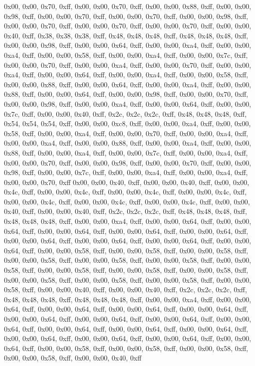 0x00, 0x00, 0x70, 0xff, 0x00, 0x00, 0x70, 0xff, 0x00, 0x00, 0x88, 0xff, 0x00, 0x00, 0x98, 0xff, 0x00, 0x00, 0x70, 0xff, 0x00, 0x00, 0x70, 0xff, 0x00, 0x00, 0x98, 0xff, 0x00, 0x00, 0x70, 0xff, 0x00, 0x00, 0x70, 0xff, 0x00, 0x00, 0x70, 0xff, 0x00, 0x00, 0x40, 0xff, 0x38, 0x38, 0x38, 0xff, 0x48, 0x48, 0x48, 0xff, 0x48, 0x48, 0x48, 0xff, 0x00, 0x00, 0x98, 0xff, 0x00, 0x00, 0x64, 0xff, 0x00, 0x00, 0xa4, 0xff, 0x00, 0x00, 0xa4, 0xff, 0x00, 0x00, 0x58, 0xff, 0x00, 0x00, 0xa4, 0xff, 0x00, 0x00, 0x7c, 0xff, 0x00, 0x00, 0x70, 0xff, 0x00, 0x00, 0xa4, 0xff, 0x00, 0x00, 0x70, 0xff, 0x00, 0x00, 0xa4, 0xff, 0x00, 0x00, 0x64, 0xff, 0x00, 0x00, 0xa4, 0xff, 0x00, 0x00, 0x58, 0xff, 0x00, 0x00, 0x88, 0xff, 0x00, 0x00, 0x64, 0xff, 0x00, 0x00, 0xa4, 0xff, 0x00, 0x00, 0x88, 0xff, 0x00, 0x00, 0x64, 0xff, 0x00, 0x00, 0x98, 0xff, 0x00, 0x00, 0x70, 0xff, 0x00, 0x00, 0x98, 0xff, 0x00, 0x00, 0xa4, 0xff, 0x00, 0x00, 0x64, 0xff, 0x00, 0x00, 0x7c, 0xff, 0x00, 0x00, 0x40, 0xff, 0x2c, 0x2c, 0x2c, 0xff, 0x48, 0x48, 0x48, 0xff, 0x54, 0x54, 0x54, 0xff, 0x00, 0x00, 0xc8, 0xff, 0x00, 0x00, 0xa4, 0xff, 0x00, 0x00, 0x58, 0xff, 0x00, 0x00, 0xa4, 0xff, 0x00, 0x00, 0x70, 0xff, 0x00, 0x00, 0xa4, 0xff, 0x00, 0x00, 0xa4, 0xff, 0x00, 0x00, 0x88, 0xff, 0x00, 0x00, 0xa4, 0xff, 0x00, 0x00, 0x88, 0xff, 0x00, 0x00, 0xa4, 0xff, 0x00, 0x00, 0x7c, 0xff, 0x00, 0x00, 0xa4, 0xff, 0x00, 0x00, 0x70, 0xff, 0x00, 0x00, 0x98, 0xff, 0x00, 0x00, 0x70, 0xff, 0x00, 0x00, 0x98, 0xff, 0x00, 0x00, 0x7c, 0xff, 0x00, 0x00, 0xa4, 0xff, 0x00, 0x00, 0xa4, 0xff, 0x00, 0x00, 0x70, 0xff
0x00, 0x00, 0x40, 0xff, 0x00, 0x00, 0x40, 0xff, 0x00, 0x00, 0x4c, 0xff, 0x00, 0x00, 0x4c, 0xff, 0x00, 0x00, 0x4c, 0xff, 0x00, 0x00, 0x4c, 0xff, 0x00, 0x00, 0x4c, 0xff, 0x00, 0x00, 0x4c, 0xff, 0x00, 0x00, 0x4c, 0xff, 0x00, 0x00, 0x40, 0xff, 0x00, 0x00, 0x40, 0xff, 0x2c, 0x2c, 0x2c, 0xff, 0x48, 0x48, 0x48, 0xff, 0x48, 0x48, 0x48, 0xff, 0x00, 0x00, 0xa4, 0xff, 0x00, 0x00, 0x64, 0xff, 0x00, 0x00, 0x64, 0xff, 0x00, 0x00, 0x64, 0xff, 0x00, 0x00, 0x64, 0xff, 0x00, 0x00, 0x64, 0xff, 0x00, 0x00, 0x64, 0xff, 0x00, 0x00, 0x64, 0xff, 0x00, 0x00, 0x64, 0xff, 0x00, 0x00, 0x64, 0xff, 0x00, 0x00, 0x58, 0xff, 0x00, 0x00, 0x58, 0xff, 0x00, 0x00, 0x58, 0xff, 0x00, 0x00, 0x58, 0xff, 0x00, 0x00, 0x58, 0xff, 0x00, 0x00, 0x58, 0xff, 0x00, 0x00, 0x58, 0xff, 0x00, 0x00, 0x58, 0xff, 0x00, 0x00, 0x58, 0xff, 0x00, 0x00, 0x58, 0xff, 0x00, 0x00, 0x58, 0xff, 0x00, 0x00, 0x58, 0xff, 0x00, 0x00, 0x58, 0xff, 0x00, 0x00, 0x58, 0xff, 0x00, 0x00, 0x40, 0xff, 0x00, 0x00, 0x40, 0xff, 0x2c, 0x2c, 0x2c, 0xff, 0x48, 0x48, 0x48, 0xff, 0x48, 0x48, 0x48, 0xff, 0x00, 0x00, 0xa4, 0xff, 0x00, 0x00, 0x64, 0xff, 0x00, 0x00, 0x64, 0xff, 0x00, 0x00, 0x64, 0xff, 0x00, 0x00, 0x64, 0xff, 0x00, 0x00, 0x64, 0xff, 0x00, 0x00, 0x64, 0xff, 0x00, 0x00, 0x64, 0xff, 0x00, 0x00, 0x64, 0xff, 0x00, 0x00, 0x64, 0xff, 0x00, 0x00, 0x64, 0xff, 0x00, 0x00, 0x64, 0xff, 0x00, 0x00, 0x64, 0xff, 0x00, 0x00, 0x64, 0xff, 0x00, 0x00, 0x64, 0xff, 0x00, 0x00, 0x64, 0xff, 0x00, 0x00, 0x58, 0xff, 0x00, 0x00, 0x58, 0xff, 0x00, 0x00, 0x58, 0xff, 0x00, 0x00, 0x58, 0xff, 0x00, 0x00, 0x40, 0xff
